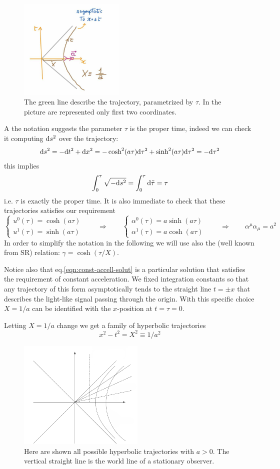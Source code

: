 \documentclass[../main/main.tex]{subfiles}
\begin{document}
\begin{figure}[H]
\centering
\includegraphics[width=5cm]{../img/const-accel-traject.jpg}
\caption{The green line describe the trajectory, parametrized by $\tau$. In the picture are represented only first two coordinates.}
\end{figure}

A the notation suggests the parameter $\tau$ is the proper time, indeed we can check it computing $\textup{d} s^2$ over the trajectory:
\[\textup{d} s^2=-\textup{d} t^2+\textup{d} x^2=-\cosh^2(a\tau)\textup{d} \tau^2+\sinh^2(a\tau)\textup{d}\tau^2=-\textup{d}\tau^2\]
this implies
\[\int_0^\tau\sqrt{-\textup{d} s^2}=\int_0^\tau\textup{d}\tilde\tau=\tau\]
i.e. $\tau$ is exactly the proper time. 
It is also immediate to check that these trajectories satisfies our requirement
\[\begin{cases}
u^0(\tau)=\cosh(a\tau)\\
u^1(\tau)=\sinh(a\tau)
\end{cases}
\qquad
\Rightarrow
\qquad
\begin{cases}
\alpha^0(\tau)=a\sinh(a\tau)\\
\alpha^1(\tau)=a\cosh(a\tau)
\end{cases}
\qquad
\Rightarrow
\qquad
\alpha^\mu\alpha_\mu=a^2
\]
In order to simplify the notation in the following we will use also the (well known from SR) relation: $\gamma=\cosh(\tau/X)$.

Notice also that eq.\eqref{eqn:const-accell-solut} is a particular solution that satisfies the requirement of constant acceleration. We fixed integration constants so that any trajectory of this form asymptotically tends to the straight line $t=\pm x$ that describes the light-like signal passing through the origin. With this specific choice $X=1/a$ can be identified with the $x$-position at $t=\tau=0$.

Letting $X=1/a$ change we get a family of hyperbolic trajectories 
\[x^2-t^2=X^2\equiv1/a^2\]

\begin{figure}[H]
\centering
\includegraphics[width=6cm]{../img/rindler-space.png}
\caption{Here are shown all possible hyperbolic trajectories with $a>0$. The vertical straight line is the world line of a stationary observer.}
\end{figure}
\end{document}
